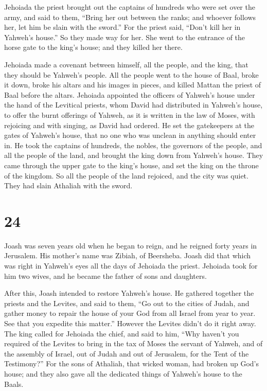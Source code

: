  Jehoiada the priest brought out the captains of hundreds
who were set over the army, and said to them, ``Bring her out between
the ranks; and whoever follows her, let him be slain with the sword.''
For the priest said, ``Don't kill her in Yahweh's house.'' 
So they made way for her. She went to the entrance of the horse gate to
the king's house; and they killed her there.

 Jehoiada made a covenant between himself, all the people,
and the king, that they should be Yahweh's people.  All the
people went to the house of Baal, broke it down, broke his altars and
his images in pieces, and killed Mattan the priest of Baal before the
altars.  Jehoiada appointed the officers of Yahweh's house
under the hand of the Levitical priests, whom David had distributed in
Yahweh's house, to offer the burnt offerings of Yahweh, as it is written
in the law of Moses, with rejoicing and with singing, as David had
ordered.  He set the gatekeepers at the gates of Yahweh's
house, that no one who was unclean in anything should enter in.
 He took the captains of hundreds, the nobles, the
governors of the people, and all the people of the land, and brought the
king down from Yahweh's house. They came through the upper gate to the
king's house, and set the king on the throne of the kingdom.
 So all the people of the land rejoiced, and the city was
quiet. They had slain Athaliah with the sword.

\hypertarget{section-23}{%
\section{24}\label{section-23}}

 Joash was seven years old when he began to reign, and he
reigned forty years in Jerusalem. His mother's name was Zibiah, of
Beersheba.  Joash did that which was right in Yahweh's eyes
all the days of Jehoiada the priest.  Jehoiada took for him
two wives, and he became the father of sons and daughters.

 After this, Joash intended to restore Yahweh's house.
 He gathered together the priests and the Levites, and said
to them, ``Go out to the cities of Judah, and gather money to repair the
house of your God from all Israel from year to year. See that you
expedite this matter.'' However the Levites didn't do it right away.
 The king called for Jehoiada the chief, and said to him,
``Why haven't you required of the Levites to bring in the tax of Moses
the servant of Yahweh, and of the assembly of Israel, out of Judah and
out of Jerusalem, for the Tent of the Testimony?''  For the
sons of Athaliah, that wicked woman, had broken up God's house; and they
also gave all the dedicated things of Yahweh's house to the Baals.

